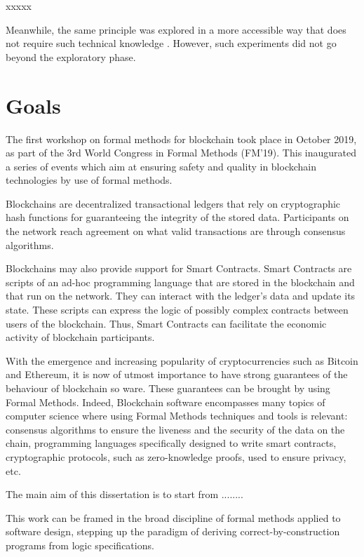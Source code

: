 \documentclass[a4paper, 11pt]{article} %
\begin{document}
xxxxx

Meanwhile, the same principle was explored in a more accessible way that
does not require such technical knowledge \cite{SO08}. However, such experiments
did not go beyond the exploratory phase.

\section*{Goals}

The first workshop on formal methods for blockchain took place in October 2019, as part of the 3rd World Congress in Formal Methods (FM'19). This inaugurated a series of events which aim at ensuring safety and quality in blockchain technologies by use of formal methods.

Blockchains are decentralized transactional ledgers that rely on cryptographic hash functions for guaranteeing the integrity of the stored data. Participants on the network reach agreement on what valid transactions are through consensus algorithms.

Blockchains may also provide support for Smart Contracts. Smart Contracts are scripts of an ad-hoc programming language that are stored in the blockchain and that run on the network. They can interact with the ledger’s data and update its state. These scripts can express the logic of possibly complex contracts between users of the blockchain. Thus, Smart Contracts can facilitate the economic activity of blockchain participants.

With the emergence and increasing popularity of cryptocurrencies such as Bitcoin and Ethereum, it is now of utmost importance to have strong guarantees of the behaviour of blockchain so ware. These guarantees can be brought by using Formal Methods. Indeed, Blockchain software encompasses many topics of computer science where using Formal Methods techniques and tools is relevant: consensus algorithms to ensure the liveness and the security of the data on the chain, programming languages specifically designed to write smart contracts, cryptographic protocols, such as zero-knowledge proofs, used to ensure privacy, etc.

The main aim of this dissertation is to start from ........



This work can be framed in the broad discipline of formal methods applied to
software design, stepping up the paradigm of deriving correct-by-construction
programs from logic specifications.
\end{document}
